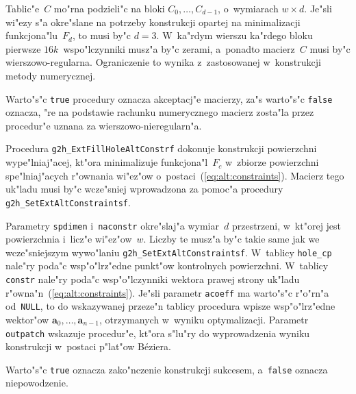 Tablic"e~$C$ mo"rna podzieli"c na bloki $C_0,\ldots,C_{d-1}$, o~wymiarach
$w\times d$. Je"sli wi"ezy s"a okre"slane na potrzeby konstrukcji opartej
na minimalizacji funkcjona"lu~$F_d$, to musi by"c $d=3$. W~ka"rdym wierszu
ka"rdego bloku pierwsze $16k$~wspo"lczynniki musz"a by"c zerami, a~ponadto
macierz~$C$ musi by"c wierszowo-regularna.
Ograniczenie to wynika z~zastosowanej w~konstrukcji metody numerycznej.

Warto"s"c \texttt{true} procedury oznacza akceptacj"e macierzy,
za"s warto"s"c \texttt{false} oznacza, "re na podstawie rachunku numerycznego
macierz zosta"la przez procedur"e uznana za wierszowo-nieregularn"a.

\vspace{\bigskipamount}
Procedura \texttt{g2h\_ExtFillHoleAltConstrf} dokonuje konstrukcji powierzchni
wype"lniaj"acej, kt"ora minimalizuje funkcjona"l~$F_c$ w~zbiorze powierzchni
spe"lniaj"acych r"ownania wi"ez"ow o~postaci~(\ref{eq:alt:constraints}).
Macierz tego uk"ladu musi by"c wcze"sniej wprowadzona za pomoc"a procedury
\texttt{g2h\_SetExtAltConstraintsf}.

Parametry \texttt{spdimen} i~\texttt{naconstr} okre"slaj"a wymiar~$d$
przestrzeni, w~kt"orej jest powierzchnia i~licz"e wi"ez"ow~$w$. Liczby te musz"a
by"c takie same jak we wcze"sniejszym wywo"laniu
\texttt{g2h\_SetExtAltConstraintsf}. W~tablicy \texttt{hole\_cp} nale"ry poda"c
wsp"o"lrz"edne punkt"ow kontrolnych powierzchni. W~tablicy \texttt{constr}
nale"ry poda"c wsp"o"lczynniki wektora prawej strony uk"ladu
r"owna"n~(\ref{eq:alt:constraints}). Je"sli parametr \texttt{acoeff} ma
warto"s"c r"o"rn"a od~\texttt{NULL}, to do wskazywanej przeze"n tablicy
procedura wpisze wsp"o"lrz"edne wektor"ow $\bm{a}_0,\ldots,\bm{a}_{n-1}$,
otrzymanych w~wyniku optymalizacji. Parametr \texttt{outpatch} wskazuje
procedur"e, kt"ora s"lu"ry do wyprowadzenia wyniku konstrukcji w~postaci
p"lat"ow B\'{e}ziera.

Warto"s"c \texttt{true} oznacza zako"nczenie konstrukcji sukcesem,
a~\texttt{false} oznacza niepowodzenie.

